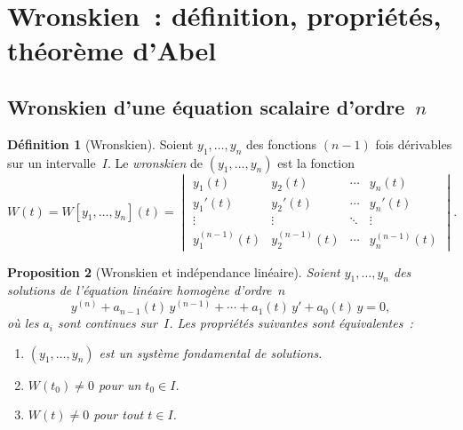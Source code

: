 \documentclass[12pt,a4paper,openany]{book}
\theoremstyle{definition}
\newtheorem{definition}{Définition}[chapter]
\theoremstyle{plain}
\newtheorem{proposition}[definition]{Proposition}
\theoremstyle{remark}
\begin{document}
\section{Wronskien~: définition, propriétés, théorème d'Abel}\label{sec:wronskien}

\subsection{Wronskien d'une équation scalaire d'ordre~$n$}\label{subsec:wronskien-scalaire}

\begin{definition}[Wronskien]\label{def:wronskien}
  Soient $y_1,\ldots,y_n$ des fonctions $(n-1)$ fois dérivables sur un
  intervalle~$I$. Le \emph{wronskien} de $(y_1,\ldots,y_n)$ est la
  fonction
  \begin{equation}\label{eq:wronskien-def}
    W(t) = W[y_1,\ldots,y_n](t)
    = \begin{vmatrix}
        y_1(t) & y_2(t) & \cdots & y_n(t) \\
        y_1'(t) & y_2'(t) & \cdots & y_n'(t) \\
        \vdots & \vdots & \ddots & \vdots \\
        y_1^{(n-1)}(t) & y_2^{(n-1)}(t) & \cdots & y_n^{(n-1)}(t)
      \end{vmatrix}.
  \end{equation}
\end{definition}

\begin{proposition}[Wronskien et indépendance linéaire]\label{prop:wronskien-indep}
  Soient $y_1,\ldots,y_n$ des solutions de l'équation linéaire homogène
  d'ordre~$n$
  \begin{equation}\label{eq:edo-lin-n}
    y^{(n)} + a_{n-1}(t)\,y^{(n-1)} + \cdots + a_1(t)\,y' + a_0(t)\,y = 0,
  \end{equation}
  où les $a_i$ sont continues sur~$I$. Les propriétés suivantes sont
  équivalentes~:
  \begin{enumerate}[label=(\roman*)]
    \item $(y_1,\ldots,y_n)$ est un système fondamental de solutions.
    \item $W(t_0) \neq 0$ pour un $t_0 \in I$.
    \item $W(t) \neq 0$ pour tout $t \in I$.
  \end{enumerate}
\end{proposition}
\end{document}
